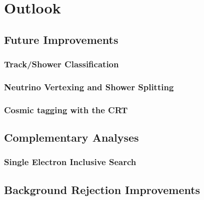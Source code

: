 
\section{Outlook}

\subsection{Future Improvements}
\subsubsection{Track/Shower Classification}
\subsubsection{Neutrino Vertexing and Shower Splitting}
\subsubsection{Cosmic tagging with the CRT}
\subsection{Complementary Analyses}
\subsubsection{Single Electron Inclusive Search}
\subsection{Background Rejection Improvements}